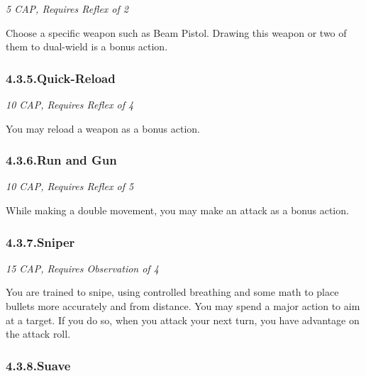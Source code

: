 \documentclass{article}
\begin{document}
\noindent{}\emph{5 CAP, Requires Reflex of 2}%

Choose a specific weapon such as Beam Pistol. Drawing this weapon or two of them to dual-wield is a bonus action.%

\subsubsection{4.3.5.\hspace*{0.5em}Quick-Reload}\label{sec-quick-reload}%

\noindent{}\emph{10 CAP, Requires Reflex of 4}%

You may reload a weapon as a bonus action.%

\subsubsection{4.3.6.\hspace*{0.5em}Run and Gun}\label{sec-run-and-gun}%

\noindent{}\emph{10 CAP, Requires Reflex of 5}%

While making a double movement, you may make an attack as a bonus action.%

\subsubsection{4.3.7.\hspace*{0.5em}Sniper}\label{sec-sniper}%

\noindent{}\emph{15 CAP, Requires Observation of 4}%

You are trained to snipe, using controlled breathing and some math to place bullets more accurately and from distance. You may spend a major action to aim at a target. If you do so, when you attack your next turn, you have advantage on the attack roll.%

\subsubsection{4.3.8.\hspace*{0.5em}Suave}\label{sec-suave}%
\end{document}
